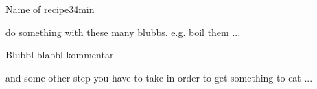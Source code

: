 \documentclass[ngerman,parskip=full]{article}
\begin{document}
\begin{recipe}{Name of recipe}{3}{4min}
\begin{step}{do something with these many blubbs. e.g. boil them ...}
\end{step}
Blubbl blabbl kommentar
\begin{step}{and some other step you have to take in order to get
    something to eat ...}
\end{step}
\end{recipe}


\end{document}
